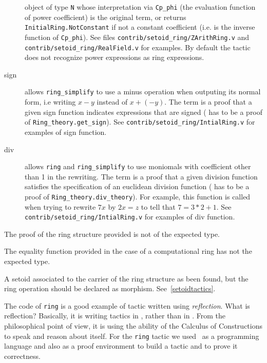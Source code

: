 \begin{description}
  object of type {\tt N} whose interpretation via {\tt Cp\_phi} (the
  evaluation function of power coefficient) is the original term, or
  returns {\tt InitialRing.NotConstant} if not a constant coefficient
  (i.e. {\ltac} is the inverse function of {\tt Cp\_phi}).
  See files {\tt contrib/setoid\_ring/ZArithRing.v} and
  {\tt contrib/setoid\_ring/RealField.v} for examples.
  By default the tactic does not recognize power expressions as ring
  expressions.
\item[sign {\term}] allows {\tt ring\_simplify} to use a minus operation
  when outputing its normal form, i.e writing $x - y$ instead of $x + (-y)$. 
  The term {\term} is a proof that a given sign function indicates expressions
   that are signed ({\term} has to be a
  proof of {\tt Ring\_theory.get\_sign}). See  {\tt contrib/setoid\_ring/IntialRing.v} for examples of sign function.
\item[div {\term}] allows  {\tt ring} and {\tt ring\_simplify} to use moniomals
with coefficient other than 1 in the rewriting. The term {\term} is a proof that a given division function  satisfies the specification of an euclidean
  division function  ({\term} has to be a
  proof of {\tt Ring\_theory.div\_theory}). For example, this function is
  called when trying to rewrite $7x$ by $2x = z$ to tell that $7 = 3 * 2 + 1$.
   See  {\tt contrib/setoid\_ring/IntialRing.v} for examples of div function.
\end{description}


\begin{ErrMsgs}
\item {}
  The proof of the ring structure provided is not of the expected type.
\item {}
  The equality function provided in the case of a computational ring
  has not the expected type.
\item {}
  A setoid associated to the carrier of the ring structure as been
  found, but the ring operation should be declared as
  morphism. See~\ref{setoidtactics}.
\end{ErrMsgs}


The code of \texttt{ring} is a good example of tactic written using
\textit{reflection}.  What is reflection? Basically, it is writing
\Coq{} tactics in \Coq, rather than in \ocaml. From the philosophical
point of view, it is using the ability of the Calculus of
Constructions to speak and reason about itself.  For the \texttt{ring}
tactic we used \Coq\ as a programming language and also as a proof
environment to build a tactic and to prove it correctness.

